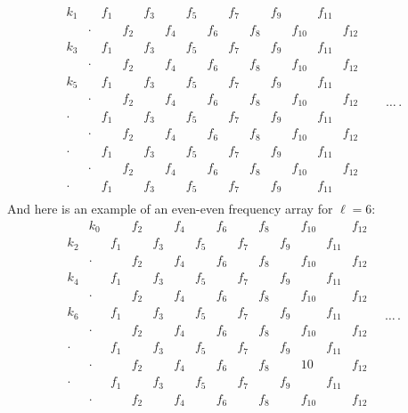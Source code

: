\documentclass[10pt,a4paper]{amsart}
\numberwithin{equation}{section}
\theoremstyle{definition}
\begin{document}
\begin{equation*}
\begin{matrix}
k_1 && f_1 && f_3 && f_5 && f_7 && f_9 && f_{11} & \\
& \cdot && f_2 && f_4 && f_6 && f_8 && f_{10} && f_{12}\\
k_3 && f_1 && f_3 && f_5 && f_7 && f_9 && f_{11} & \\
& \cdot && f_2 && f_4 && f_6 && f_8 && f_{10} && f_{12}\\
k_5 && f_1 && f_3 && f_5 && f_7 && f_9 && f_{11} & \\
& \cdot && f_2 && f_4 && f_6 && f_8 && f_{10} && f_{12}\\
\cdot && f_1 && f_3 && f_5 && f_7 && f_9 && f_{11} & & \\
& \cdot && f_2 && f_4 && f_6 && f_8 && f_{10} && f_{12}\\
\cdot && f_1 && f_3 && f_5 && f_7 && f_9 && f_{11} & \\
& \cdot && f_2 && f_4 && f_6 && f_8 && f_{10} && f_{12}\\
\cdot && f_1 && f_3 && f_5 && f_7 && f_9 && f_{11} & \\
\end{matrix}\quad\dots \,.
\end{equation*}
And here is an example of an even-even frequency array for $\ell=6$:
\begin{equation*}
\begin{matrix}
& k_0 && f_2 && f_4 && f_6 && f_8 && f_{10} && f_{12}\\
k_2 && f_1 && f_3 && f_5 && f_7 && f_9 && f_{11} & \\
& \cdot && f_2 && f_4 && f_6 && f_8 && f_{10} && f_{12}\\
k_4 && f_1 && f_3 && f_5 && f_7 && f_9 && f_{11} & \\
& \cdot && f_2 && f_4 && f_6 && f_8 && f_{10} && f_{12}\\
k_6 && f_1 && f_3 && f_5 && f_7 && f_9 && f_{11} & \\
& \cdot && f_2 && f_4 && f_6 && f_8 && f_{10} && f_{12}\\
\cdot && f_1 && f_3 && f_5 && f_7 && f_9 && f_{11} & \\
& \cdot && f_2 && f_4 && f_6 && f_8 && 10 && f_{12}\\
\cdot && f_1 && f_3 && f_5 && f_7 && f_9 && f_{11} & \\
& \cdot && f_2 && f_4 && f_6 && f_8 && f_{10} && f_{12}\\
\end{matrix}\quad\dots \,.
\end{equation*}
\end{document}

